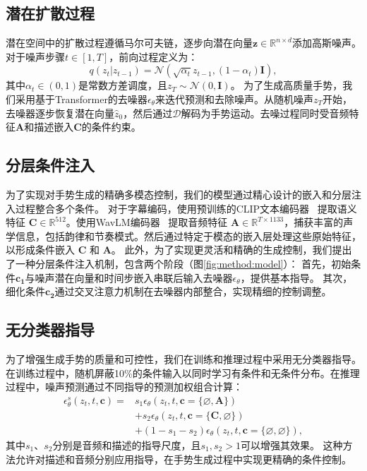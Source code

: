 \subsection{潜在扩散过程}
潜在空间中的扩散过程遵循马尔可夫链，逐步向潜在向量$\mathbf{z} \in \mathbb{R}^{n\times d}$添加高斯噪声。对于噪声步骤$t \in [1,T]$，前向过程定义为：
\begin{equation}
  q(z_t|z_{t-1}) = \mathcal{N}(\sqrt{\alpha_t}z_{t-1}, (1-\alpha_t)\mathbf{I}),
\end{equation}
其中$\alpha_t \in (0,1)$是常数方差调度，且$z_T \sim \mathcal{N}(0, \mathbf{I})$。
为了生成高质量手势，我们采用基于Transformer的去噪器$\epsilon_\theta$来迭代预测和去除噪声。从随机噪声$z_T$开始，去噪器逐步恢复潜在向量$\hat{z}_0$，然后通过$\mathcal{D}$解码为手势运动。去噪过程同时受音频特征$\mathbf{A}$和描述嵌入$\mathbf{C}$的条件约束。

\subsection{分层条件注入}
为了实现对手势生成的精确多模态控制，我们的模型通过精心设计的嵌入和分层注入过程整合多个条件。
对于字幕编码，使用预训练的CLIP文本编码器~\cite{radford2021clip} 提取语义特征 $\mathbf{C} \in \mathbb{R}^{512}$。使用WavLM编码器~\cite{chen2022wavlm} 提取音频特征 $\mathbf{A} \in \mathbb{R}^{T\times1133}$，捕获丰富的声学信息，包括韵律和节奏模式。然后通过特定于模态的嵌入层处理这些原始特征，以形成条件嵌入 $\mathbf{C}$ 和 $\mathbf{A}$。
此外，为了实现更灵活和精确的生成控制，我们提出了一种分层条件注入机制，包含两个阶段（图\ref{fig:method:model}）：
首先，初始条件$\mathbf{c_1}$与噪声潜在向量和时间步嵌入串联后输入去噪器$\epsilon_\theta$，提供基本指导。
其次，细化条件$\mathbf{c_2}$通过交叉注意力机制在去噪器内部整合，实现精细的控制调整。

\subsection{无分类器指导}
为了增强生成手势的质量和可控性，我们在训练和推理过程中采用无分类器指导\cite{ho2022classifier}。在训练过程中，随机屏蔽10\%的条件输入以同时学习有条件和无条件分布。在推理过程中，噪声预测通过不同指导的预测加权组合计算：
\begin{equation}
  \begin{split}
      \epsilon_\theta^s(z_t, t, \mathbf{c}) = & s_1 \epsilon_\theta(z_t, t, \mathbf{c}=\{\varnothing, \mathbf{A}\}) \\
      & + s_2 \epsilon_\theta(z_t, t, \mathbf{c}=\{\mathbf{C}, \varnothing\}) \\
      & + (1 - s_1 - s_2) \epsilon_\theta(z_t, t, \mathbf{c}=\{\varnothing, \varnothing\}),
  \end{split}
\end{equation}
其中$s_1$、$s_2$分别是音频和描述的指导尺度，且$s_1, s_2 > 1$可以增强其效果。
这种方法允许对描述和音频分别应用指导，在手势生成过程中实现更精确的条件控制。

